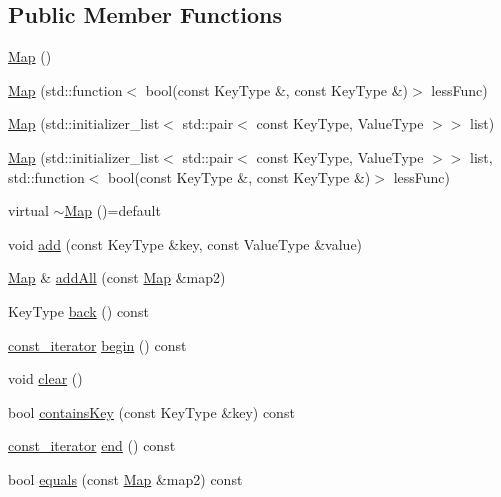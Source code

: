 \subsection*{Public Member Functions}
\begin{DoxyCompactItemize}
\item 
\mbox{\hyperlink{classMap_a49848ab3a0e1934c5615242b67af68c7}{Map}} ()
\item 
\mbox{\hyperlink{classMap_afeeb032b309df7c22d2640f98e0dd9a4}{Map}} (std\+::function$<$ bool(const Key\+Type \&, const Key\+Type \&)$>$ less\+Func)
\item 
\mbox{\hyperlink{classMap_a79fa612ecdfc84da8a66341c76e6bd85}{Map}} (std\+::initializer\+\_\+list$<$ std\+::pair$<$ const Key\+Type, Value\+Type $>$$>$ list)
\item 
\mbox{\hyperlink{classMap_a67384221d4d1bf326b8fd854488e2264}{Map}} (std\+::initializer\+\_\+list$<$ std\+::pair$<$ const Key\+Type, Value\+Type $>$$>$ list, std\+::function$<$ bool(const Key\+Type \&, const Key\+Type \&)$>$ less\+Func)
\item 
virtual \mbox{\hyperlink{classMap_aa23229d7196c7a4b09cb605b419acc3b}{$\sim$\+Map}} ()=default
\item 
void \mbox{\hyperlink{classMap_a9129d6095063e7e14d85c627d35086a5}{add}} (const Key\+Type \&key, const Value\+Type \&value)
\item 
\mbox{\hyperlink{classMap}{Map}} \& \mbox{\hyperlink{classMap_a44f4dae7b5abf1bd265cd5e8cb6cf47b}{add\+All}} (const \mbox{\hyperlink{classMap}{Map}} \&map2)
\item 
Key\+Type \mbox{\hyperlink{classMap_adfa4b8f8e4f5ecc11fb76a3efba70d70}{back}} () const
\item 
\mbox{\hyperlink{classMap_a04e3b848cce2bbfed5ea818e1b264000}{const\+\_\+iterator}} \mbox{\hyperlink{classMap_aa70377b8ab33c528e81e1a7e7b9da9fc}{begin}} () const
\item 
void \mbox{\hyperlink{classMap_ac8bb3912a3ce86b15842e79d0b421204}{clear}} ()
\item 
bool \mbox{\hyperlink{classMap_a37473445b6725c5f0fc59a32ea2e645e}{contains\+Key}} (const Key\+Type \&key) const
\item 
\mbox{\hyperlink{classMap_a04e3b848cce2bbfed5ea818e1b264000}{const\+\_\+iterator}} \mbox{\hyperlink{classMap_a5b99f697823461ff62f22bd052079375}{end}} () const
\item 
bool \mbox{\hyperlink{classMap_a91a1c833c72a288f2e2ea0207449513a}{equals}} (const \mbox{\hyperlink{classMap}{Map}} \&map2) const
\item 

\end{DoxyCompactItemize}
